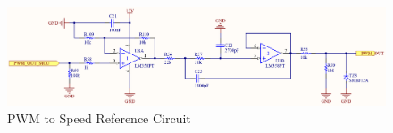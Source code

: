 	
		\begin{figure}[htbp]
			\centering
				\includegraphics[scale=0.8]{figuras/fig-pwmToSpeedReferenceCircuit}
			\caption{PWM to Speed Reference Circuit}
			\label{fig:pwmToSpeedReferenceCircuit}
		\end{figure}

